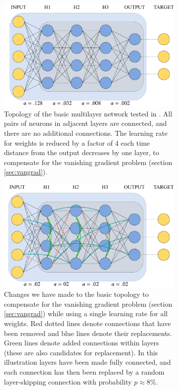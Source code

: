 \documentclass[format=sigconf]{acmart}
\begin{document}
\begin{figure}
  \centering
  \begin{subfigure}[t]{.48\textwidth}
    \includegraphics[width=.9\textwidth]{figures/basic_topology_illustration.pdf}
    \caption{Topology of the basic multilayer network tested in \cite{scellier17}. All pairs of neurons in adjacent layers are connected, and there are no additional connections. The learning rate for weights is reduced by a factor of 4 each time distance from the output decreases by one layer, to compensate for the vanishing gradient problem (section \ref{sec:vangrad}).}
    \label{fig:top_basic}
  \end{subfigure}
  \hfill
  \begin{subfigure}[t]{.48\textwidth}
    \includegraphics[width=.9\textwidth]{figures/topology_changes_illustration.pdf}
    \caption{Changes we have made to the basic topology to compensate for the vanishing gradient problem (section \ref{sec:vangrad}) while using a single learning rate for all weights. Red dotted lines denote connections that have been removed and blue lines denote their replacements. Green lines denote added connections within layers (these are also candidates for replacement). In this illustration layers have been made fully connected, and each connection has then been replaced by a random layer-skipping connection with probability $p\approx 8\%$.}
    \label{fig:top_sw}
  \end{subfigure}
  \caption{}
  \label{fig:topology_illus}
\end{figure}
\end{document}
